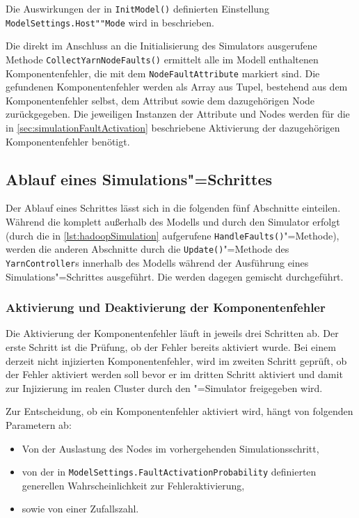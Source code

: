 Die Auswirkungen der in \texttt{InitModel()} definierten Einstellung \texttt{ModelSettings.Host""Mode} wird in  beschrieben.

Die direkt im Anschluss an die Initialisierung des Simulators ausgerufene Methode \texttt{CollectYarnNodeFaults()} ermittelt alle im Modell enthaltenen Komponentenfehler, die mit dem \texttt{NodeFaultAttribute} markiert sind.
Die gefundenen Komponentenfehler werden als Array aus Tupel, bestehend aus dem Komponentenfehler selbst, dem Attribut sowie dem dazugehörigen Node zurückgegeben.
Die jeweiligen Instanzen der Attribute und Nodes werden für die in \autoref{sec:simulationFaultActivation} beschriebene Aktivierung der dazugehörigen Komponentenfehler benötigt.

\subsection{Ablauf eines Simulations"=Schrittes}\label{sec:simulationStep}

Der Ablauf eines Schrittes lässt sich in die folgenden fünf Abschnitte einteilen.
Während die  komplett außerhalb des Modells und durch den Simulator erfolgt (durch die in \autoref{lst:hadoopSimulation} aufgerufene \texttt{HandleFaults()}"=Methode), werden die anderen Abschnitte durch die \texttt{Update()}"=Methode des \texttt{YarnController}s innerhalb des Modells während der Ausführung eines Simulations"=Schrittes ausgeführt.
Die  werden dagegen gemischt durchgeführt.

\subsubsection{Aktivierung und Deaktivierung der Komponentenfehler}\label{sec:simulationFaultActivation}

Die Aktivierung der Komponentenfehler läuft in jeweils drei Schritten ab.
Der erste Schritt ist die Prüfung, ob der Fehler bereits aktiviert wurde.
Bei einem derzeit nicht injizierten Komponentenfehler, wird im zweiten Schritt geprüft, ob der Fehler aktiviert werden soll bevor er im dritten Schritt aktiviert und damit zur Injizierung im realen Cluster durch den \sS"=Simulator freigegeben wird.

Zur Entscheidung, ob ein Komponentenfehler aktiviert wird, hängt von folgenden Parametern ab:

\begin{itemize}
    \item Von der Auslastung des Nodes im vorhergehenden Simulationsschritt,
    \item von der in \texttt{ModelSettings.FaultActivationProbability} definierten generellen Wahrscheinlichkeit zur Fehleraktivierung,
    \item sowie von einer Zufallszahl.
\end{itemize}

